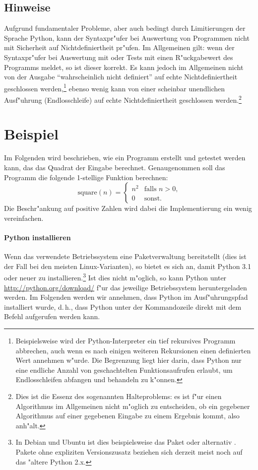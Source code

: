 \documentclass[a4paper,ngerman]{article}
\newcommand{\dH}{d.\,h.}
\begin{document}
\subsection{Hinweise}
Aufgrund fundamentaler Probleme, aber auch bedingt durch Limitierungen
der Sprache Python, kann der Syntaxpr"ufer bei Auswertung von
Programmen nicht mit Sicherheit auf Nichtdefiniertheit pr"ufen. Im
Allgemeinen gilt: wenn der Syntaxpr"ufer bei Auswertung mit 
oder Tests mit  einen R"uckgabewert des Programms meldet, so ist
dieser korrekt. Es kann jedoch im Allgemeinen nicht von der Ausgabe
"`wahrscheinlich nicht definiert"' auf echte Nichtdefiniertheit
geschlossen werden,\footnote{Beispielsweise wird der
  Python-Interpreter ein tief rekursives Programm abbrechen, auch wenn
  es nach einigen weiteren Rekursionen einen definierten Wert annehmen
  w"urde. Die Begrenzung liegt hier darin, dass Python nur eine
  endliche Anzahl von geschachtelten Funktionsaufrufen erlaubt, um
  Endlosschleifen abfangen und behandeln zu k"onnen.} ebenso wenig
kann von einer scheinbar unendlichen Ausf"uhrung (Endlosschleife) auf
echte Nichtdefiniertheit geschlossen werden.\footnote{Dies ist die
  Essenz des sogenannten Halteproblems: es ist f"ur einen Algorithmus
  im Allgemeinen nicht m"oglich zu entscheiden, ob ein gegebener
  Algorithmus auf einer gegebenen Eingabe zu einem Ergebnis kommt,
  also anh"alt.}
\section{Beispiel}
Im Folgenden wird beschrieben, wie ein Programm erstellt und getestet
werden kann, das das Quadrat der Eingabe berechnet. Genaugenommen soll
das Programm die folgende 1-stellige Funktion berechnen:
\begin{equation*}
  \textrm{square}(n) = \begin{cases}
    n^2 & \text{falls $n > 0$,} \\
    0 & \text{sonst.}
  \end{cases}
\end{equation*}
Die Beschr"ankung auf positive Zahlen wird dabei die Implementierung
ein wenig vereinfachen.
\paragraph{Python installieren}
Wenn das verwendete Betriebssystem eine Paketverwaltung bereitstellt
(dies ist der Fall bei den meisten Linux-Varianten), so bietet es sich
an, damit Python 3.1 oder neuer zu installieren.\footnote{In Debian
  und Ubuntu ist dies beispielsweise das Paket  oder
  alternativ . Pakete ohne expliziten Versionszusatz
  beziehen sich derzeit meist noch auf das "altere Python 2.x.} Ist
dies nicht m"oglich, so kann Python unter
\url{http://python.org/download/} f"ur das jeweilige Betriebssystem
heruntergeladen werden. Im Folgenden werden wir annehmen, dass Python
im Ausf"uhrungspfad installiert wurde, \dH, dass Python unter der
Kommandozeile direkt mit dem Befehl  aufgerufen werden kann.
\end{document}
